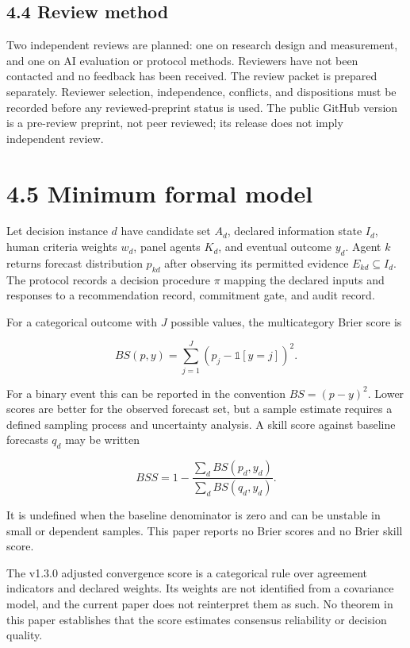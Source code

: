 \documentclass[
  english,
]{article}
\begin{document}
\subsection{4.4 Review method}\label{review-method}

Two independent reviews are planned: one on research design and
measurement, and one on AI evaluation or protocol methods. Reviewers
have not been contacted and no feedback has been received. The review
packet is prepared separately. Reviewer selection, independence,
conflicts, and dispositions must be recorded before any
reviewed-preprint status is used. The public GitHub version is a
pre-review preprint, not peer reviewed; its release does not imply
independent review.

\section{4.5 Minimum formal model}\label{minimum-formal-model}

Let decision instance \(d\) have candidate set \(A_d\), declared
information state \(I_d\), human criteria weights \(w_d\), panel agents
\(K_d\), and eventual outcome \(y_d\). Agent \(k\) returns forecast
distribution \(p_{kd}\) after observing its permitted evidence
\(E_{kd} \subseteq I_d\). The protocol records a decision procedure
\(\pi\) mapping the declared inputs and responses to a recommendation
record, commitment gate, and audit record.

For a categorical outcome with \(J\) possible values, the multicategory
Brier score is

\[BS(p,y)=\sum_{j=1}^{J}(p_j-\mathbb{1}[y=j])^2.\]

For a binary event this can be reported in the convention
\(BS=(p-y)^2\). Lower scores are better for the observed forecast set,
but a sample estimate requires a defined sampling process and
uncertainty analysis. A skill score against baseline forecasts \(q_d\)
may be written

\[BSS=1-\frac{\sum_d BS(p_d,y_d)}{\sum_d BS(q_d,y_d)}.\]

It is undefined when the baseline denominator is zero and can be
unstable in small or dependent samples. This paper reports no Brier
scores and no Brier skill score.

The v1.3.0 adjusted convergence score is a categorical rule over
agreement indicators and declared weights. Its weights are not
identified from a covariance model, and the current paper does not
reinterpret them as such. No theorem in this paper establishes that the
score estimates consensus reliability or decision quality.
\end{document}
